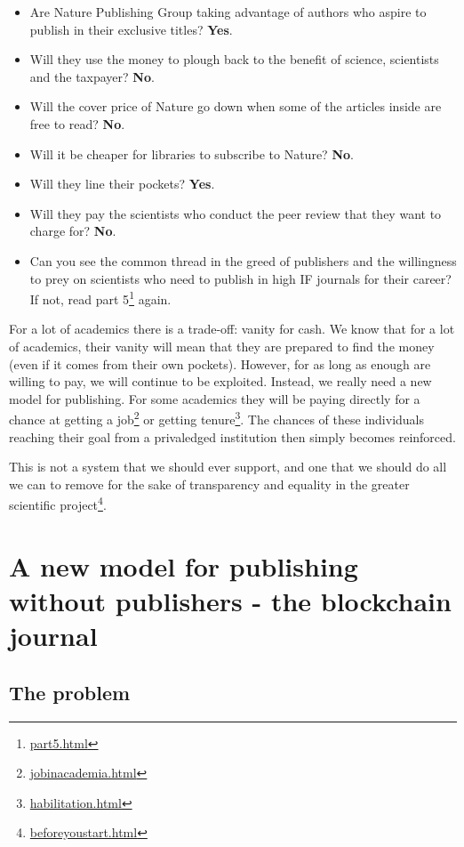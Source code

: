 \documentclass[
]{krantz}
\providecommand{\tightlist}{%
  \setlength{\itemsep}{0pt}\setlength{\parskip}{0pt}}
\renewcommand{\href}[2]{#2\footnote{\url{#1}}}
\begin{document}
\begin{itemize}
\tightlist
\item
  Are Nature Publishing Group taking advantage of authors who aspire to publish in their exclusive titles? \textbf{Yes}.
\item
  Will they use the money to plough back to the benefit of science, scientists and the taxpayer? \textbf{No}.
\item
  Will the cover price of Nature go down when some of the articles inside are free to read? \textbf{No}.
\item
  Will it be cheaper for libraries to subscribe to Nature? \textbf{No}.
\item
  Will they line their pockets? \textbf{Yes}.
\item
  Will they pay the scientists who conduct the peer review that they want to charge for? \textbf{No}.
\item
  Can you see the common thread in the greed of publishers and the willingness to prey on scientists who need to publish in high IF journals for their career? If not, read \href{part5.html}{part 5} again.
\end{itemize}

For a lot of academics there is a trade-off: vanity for cash. We know that for a lot of academics, their vanity will mean that they are prepared to find the money (even if it comes from their own pockets). However, for as long as enough are willing to pay, we will continue to be exploited. Instead, we really need a new model for publishing. For some academics they will be paying directly for a chance at \href{jobinacademia.html}{getting a job} or \href{habilitation.html}{getting tenure}. The chances of these individuals reaching their goal from a privaledged institution then simply becomes reinforced.

This is not a system that we should ever support, and one that we should do all we can to remove for the sake of transparency and equality in the greater \href{beforeyoustart.html}{scientific project}.

\hypertarget{a-new-model-for-publishing-without-publishers---the-blockchain-journal}{%
\section{A new model for publishing without publishers - the blockchain journal}\label{a-new-model-for-publishing-without-publishers---the-blockchain-journal}}

\hypertarget{the-problem}{%
\subsection{The problem}\label{the-problem}}
\end{document}
